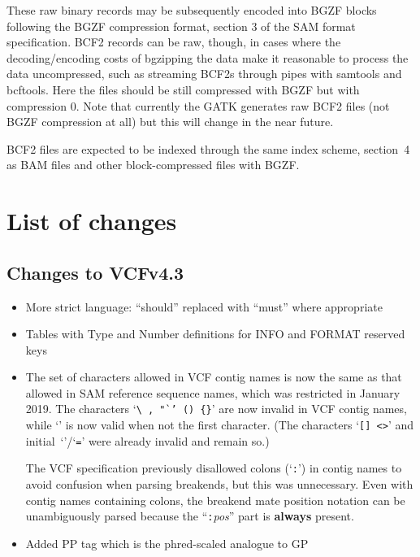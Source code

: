 \documentclass[8pt]{article}
\begin{document}
These raw binary records may be subsequently encoded into BGZF blocks following the BGZF compression format, section 3 of the SAM format specification.
BCF2 records can be raw, though, in cases where the decoding/encoding costs of bgzipping the data make it reasonable to process the data uncompressed, such as streaming BCF2s through pipes with samtools and bcftools.
Here the files should be still compressed with BGZF but with compression 0.
Note that currently the GATK generates raw BCF2 files (not BGZF compression at all) but this will change in the near future.

BCF2 files are expected to be indexed through the same index scheme, section~4 as BAM files and other block-compressed files with BGZF.

\section{List of changes}

\subsection{Changes to VCFv4.3}

\begin{itemize}
\item More strict language: ``should'' replaced with ``must'' where appropriate
\item Tables with Type and Number definitions for INFO and FORMAT reserved keys

\item
The set of characters allowed in VCF contig names is now the same as that allowed in SAM reference sequence names, which was restricted in January 2019.
The characters `{\tt\verb|\|\,,\,"`'\,()\,\verb|{}|}' are now invalid in VCF contig names, while `{\tt *}' is now valid when not the first character.
(The characters `{\tt []\,<>}' and initial~`{\tt *}'/`{\tt =}' were already invalid and remain so.)

The VCF specification previously disallowed colons (`{\tt :}') in contig names to avoid confusion when parsing breakends, but this was unnecessary.
Even with contig names containing colons, the breakend mate position notation can be unambiguously parsed because the ``{\tt :}\emph{pos}'' part is \textbf{always} present.

\item Added PP tag which is the phred-scaled analogue to GP
\end{itemize}
\end{document}
